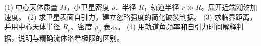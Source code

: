 (1) 中心天体质量 \(M\)，小卫星密度 \(\rho\)、半径 \(R\)，轨道半径 \(r\gg R\)。展开近端潮汐加速度。
(2) 求卫星表面自引力，建立忽略强度的简化破裂判据。
(3) 求临界距离，并用中心天体半径 \(R_p\)、密度 \(\rho_p\) 表示。
(4) 用轨道角频率和自引力时间解释判据，说明与精确流体洛希极限的区别。
